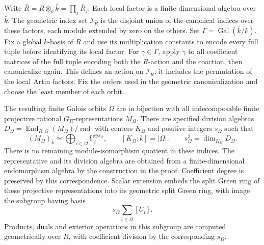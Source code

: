 Write $\bar R=R\otimes_k\bar k=\prod_j\bar R_j$.
Each local factor is a finite-dimensional algebra over $\bar k$.
The geometric index set $\mathscr I_{\bar R}$ is the disjoint
union of the canonical indices over these factors, each module
extended by zero on the others. Set
$\Gamma=\operatorname{Gal}(\bar k/k)$.
Fix a global $k$-basis of $R$ and use its multiplication constants
to encode every full tuple before identifying its local factor.
For $\gamma\in\Gamma$, apply $\gamma$ to all coefficient matrices
of the full tuple encoding both the $R$-action and the coaction,
then canonicalize again. This defines an action on
$\mathscr I_{\bar R}$; it includes the permutation of the local
Artin factors. Fix the orders used in the geometric
canonicalization and choose the least member of each orbit.

\begin{theorem}
\label{C:artinian_perfect_Galois_indices}
The resulting finite Galois orbits $\Omega$ are in bijection
with all indecomposable finite projective rational
$G_R$-representations $M_\Omega$.
There are specified division algebras
$D_\Omega=\operatorname{End}_{R,G}(M_\Omega)/\operatorname{rad}$
with centers $K_\Omega$ and positive integers $s_\Omega$ such that
\[
 (M_\Omega)_{\bar k}\simeq
       \bigoplus_{i\in\Omega}U_i^{\oplus s_\Omega},\qquad
 [K_\Omega:k]=|\Omega|,\qquad
 s_\Omega^2=\dim_{K_\Omega}D_\Omega .                       \tag{C.3.P1}
\]
There is no remaining module-isomorphism quotient in these
indices. The representative and its division algebra are obtained
from a finite-dimensional endomorphism algebra by the construction
in the proof. Coefficient degree is preserved by this
correspondence. Scalar extension embeds the split Green ring
of these projective representations into its geometric split
Green ring, with image the subgroup having basis
\[
                  s_\Omega\sum_{i\in\Omega}[U_i].          \tag{C.3.P2}
\]
Products, duals and exterior operations in this subgroup are
computed geometrically over $\bar R$, with coefficient division
by the corresponding $s_\Omega$.
\end{theorem}

